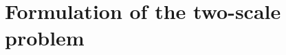 \documentclass[MikaelDissertation.tex]{subfiles}
\begin{document}
%   
%     
% 


\chapter{Formulation of the two-scale problem}
\end{document}
